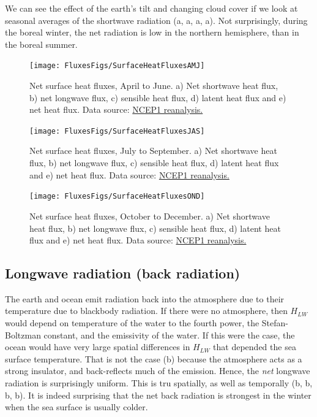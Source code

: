 We can see the effect of the earth's tilt and changing cloud cover if we look at seasonal averages of the shortwave radiation (a, a, a, a).  Not surprisingly, during the boreal winter, the net radiation is low in the northern hemisphere, than in the boreal summer.  

\begin{figure}[htb]
  \centering
  \texttt{[image: FluxesFigs/SurfaceHeatFluxesAMJ]}
  \caption{Net surface heat fluxes, April to June.  a) Net shortwave heat flux, b) net longwave flux, c) sensible heat flux, d) latent heat flux and e) net heat flux. 
  Data source:  \href{https://psl.noaa.gov/data/gridded/data.ncep.reanalysis.derived.surfaceflux.html}{NCEP1 reanalysis.}  }
  \label{fig:SurfaceHeatFluxesAMJ}
\end{figure}

\begin{figure}[htb]
  \centering
  \texttt{[image: FluxesFigs/SurfaceHeatFluxesJAS]}
  \caption{Net surface heat fluxes, July to September.  a) Net shortwave heat flux, b) net longwave flux, c) sensible heat flux, d) latent heat flux and e) net heat flux. 
  Data source:  \href{https://psl.noaa.gov/data/gridded/data.ncep.reanalysis.derived.surfaceflux.html}{NCEP1 reanalysis.}  }
  \label{fig:SurfaceHeatFluxesJAS}
\end{figure}

\begin{figure}[htb]
  \centering
  \texttt{[image: FluxesFigs/SurfaceHeatFluxesOND]}
  \caption{Net surface heat fluxes, October to December.  a) Net shortwave heat flux, b) net longwave flux, c) sensible heat flux, d) latent heat flux and e) net heat flux. 
  Data source:  \href{https://psl.noaa.gov/data/gridded/data.ncep.reanalysis.derived.surfaceflux.html}{NCEP1 reanalysis.}  }
  \label{fig:SurfaceHeatFluxesOND}
\end{figure}
\clearpage
\subsection{Longwave radiation (back radiation)}

The earth and ocean emit radiation back into the atmosphere due to their temperature due to blackbody radiation.  If there were no atmosphere, then $H_{LW}$ would depend on temperature of the water to the fourth power, the Stefan-Boltzman constant, and the emissivity of the water.  If this were the case, the ocean would have very large spatial differences in $H_{LW}$ that depended the sea surface temperature.  That is not the case (b) because the atmosphere acts as a strong insulator, and back-reflects much of the emission.  Hence, the \emph{net} longwave radiation is surprisingly uniform.  This is tru spatially, as well as temporally  (b, b, b, b).  It is indeed surprising that the net back radiation is strongest in the winter when the sea surface is usually colder.

